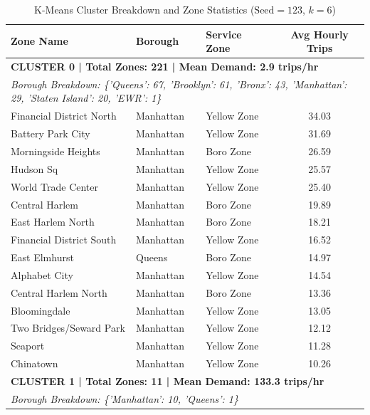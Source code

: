\documentclass[11pt,a4paper]{article}
\begin{document}
\begin{table}[htbp]
    \centering
    \tiny
    \caption{K-Means Cluster Breakdown and Zone Statistics ($\text{Seed} = 123$, $k = 6$)}
    \label{tab:kmeans_seed123_clusters}
    \begin{tabular}{lllc}
        \toprule
        \textbf{Zone Name} & \textbf{Borough} & \textbf{Service Zone} & \textbf{Avg Hourly Trips} \\
        \midrule
        \multicolumn{4}{l}{\textbf{CLUSTER 0 | Total Zones: 221 | Mean Demand: 2.9 trips/hr}} \\
        \multicolumn{4}{l}{\textit{Borough Breakdown: \{'Queens': 67, 'Brooklyn': 61, 'Bronx': 43, 'Manhattan': 29, 'Staten Island': 20, 'EWR': 1\}}} \\
        \midrule
        Financial District North & Manhattan & Yellow Zone & 34.03 \\
        Battery Park City & Manhattan & Yellow Zone & 31.69 \\
        Morningside Heights & Manhattan & Boro Zone & 26.59 \\
        Hudson Sq & Manhattan & Yellow Zone & 25.57 \\
        World Trade Center & Manhattan & Yellow Zone & 25.40 \\
        Central Harlem & Manhattan & Boro Zone & 19.89 \\
        East Harlem North & Manhattan & Boro Zone & 18.21 \\
        Financial District South & Manhattan & Yellow Zone & 16.52 \\
        East Elmhurst & Queens & Boro Zone & 14.97 \\
        Alphabet City & Manhattan & Yellow Zone & 14.54 \\
        Central Harlem North & Manhattan & Boro Zone & 13.36 \\
        Bloomingdale & Manhattan & Yellow Zone & 13.05 \\
        Two Bridges/Seward Park & Manhattan & Yellow Zone & 12.12 \\
        Seaport & Manhattan & Yellow Zone & 11.28 \\
        Chinatown & Manhattan & Yellow Zone & 10.26 \\
        \midrule
        \multicolumn{4}{l}{\textbf{CLUSTER 1 | Total Zones: 11 | Mean Demand: 133.3 trips/hr}} \\
        \multicolumn{4}{l}{\textit{Borough Breakdown: \{'Manhattan': 10, 'Queens': 1\}}} \\

\end{tabular}
\end{table}
\end{document}
